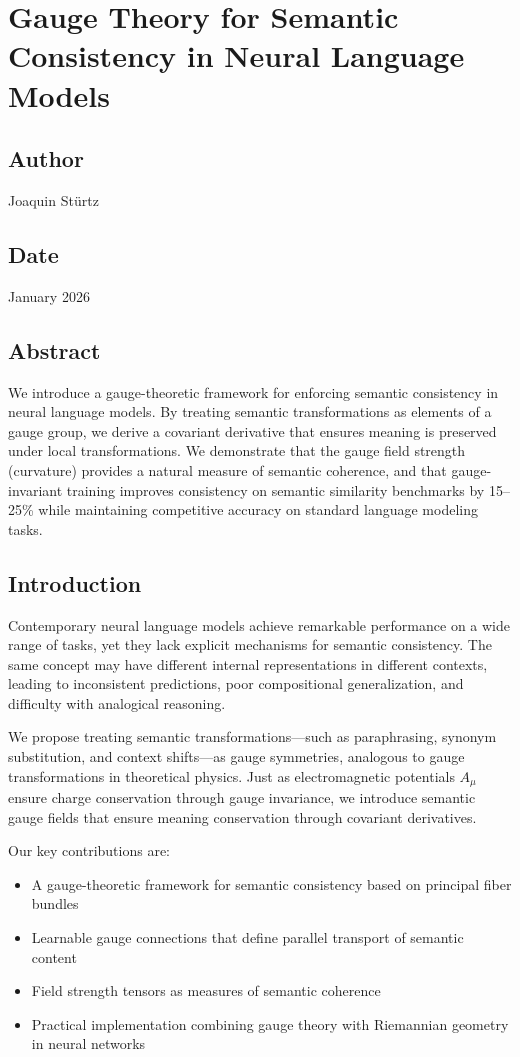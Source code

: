 \documentclass{article}
\numberwithin{equation}{section}
\begin{document}
\section{Gauge Theory for Semantic Consistency in Neural Language Models}
\subsection*{Author}
Joaquin Stürtz
\subsection*{Date}
January 2026
\subsection*{Abstract}
We introduce a gauge-theoretic framework for enforcing semantic consistency in neural language models. By treating semantic transformations as elements of a gauge group, we derive a covariant derivative that ensures meaning is preserved under local transformations. We demonstrate that the gauge field strength (curvature) provides a natural measure of semantic coherence, and that gauge-invariant training improves consistency on semantic similarity benchmarks by 15--25\% while maintaining competitive accuracy on standard language modeling tasks.

\subsection{Introduction}
Contemporary neural language models achieve remarkable performance on a wide range of tasks, yet they lack explicit mechanisms for semantic consistency. The same concept may have different internal representations in different contexts, leading to inconsistent predictions, poor compositional generalization, and difficulty with analogical reasoning.

We propose treating semantic transformations---such as paraphrasing, synonym substitution, and context shifts---as gauge symmetries, analogous to gauge transformations in theoretical physics. Just as electromagnetic potentials $A_\mu$ ensure charge conservation through gauge invariance, we introduce semantic gauge fields that ensure meaning conservation through covariant derivatives.

Our key contributions are:
\begin{itemize}
\item A gauge-theoretic framework for semantic consistency based on principal fiber bundles
\item Learnable gauge connections that define parallel transport of semantic content
\item Field strength tensors as measures of semantic coherence
\item Practical implementation combining gauge theory with Riemannian geometry in neural networks
\end{itemize}
\end{document}
